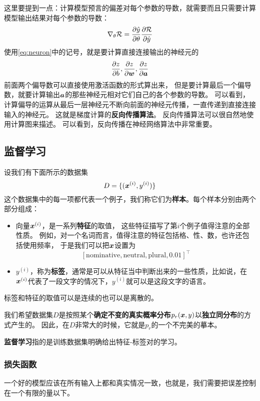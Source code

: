 \documentclass[UTF8, a4paper]{ctexart}
\begin{document}
这里要提到一点：计算模型预言的偏差对每个参数的导数，就需要而且只需要计算模型输出结果对每个参数的导数：
\[
    \nabla_\theta \mathcal{R} = \pdv{\hat{y}}{\theta} \pdv{\mathcal{R}}{\hat{y}}
\]
使用\eqref{eq:neuron}中的记号，就是要计算直接连接输出的神经元的
\[
    \pdv{z}{b}, \pdv{z}{\vb*{w}}, \pdv{z}{\vb*{a}}
\]
前面两个偏导数可以直接使用激活函数的形式算出来，
但是要计算最后一个偏导数，就要计算输出$\vb*{a}$的那些神经元相对它们自己的各个参数的导数。
可以看到，计算偏导的运算从最后一层神经元不断向前面的神经元传播，一直传递到直接连接输入的神经元。
这就是梯度计算的\textbf{反向传播算法}。
反向传播算法可以很自然地使用计算图来描述。
可以看到，反向传播在神经网络算法中非常重要。

\hypertarget{sec:supervised-learning}{%
\subsection{监督学习}\label{sec:supervised-learning}}

设我们有下面所示的数据集
\[
D = \{(\vb*{x}^{(i)}, y^{(i)})\}
\]
这个数据集中的每一项都代表一个例子，我们称它们为\textbf{样本}。每个样本分别由两个部分组成：
\begin{itemize}
    \item 向量$\vb*{x}^{(i)}$，是一系列\textbf{特征}的取值，
    这些特征描写了第$i$个例子值得注意的全部性质。
    例如，对一个名词而言，值得注意的特征包括格、性、数，也许还包括使用频率，
    于是我们可以把$\vb*{x}$设置为
    \[
        [\text{nominative}, \text{neutral}, \text{plural}, 0.01]^\top
    \]
    \item $y^{(i)}$，称为\textbf{标签}，通常是可以从特征当中判断出来的一些性质，比如说，在$\vb*{x}^{(i)}$代表了一段文字的情况下，$y^{(i)}$就可以是这段文字的语言。
\end{itemize}

标签和特征的取值可以是连续的也可以是离散的。

我们希望数据集$D$是按照某个\textbf{确定不变的真实概率分布}$p_r(\vb*{x}, y)$以\textbf{独立同分布}的方式产生的。
因此，在$D$非常大的时候，它就是$p_r$的一个不完美的摹本。

\textbf{监督学习}指的是训练数据集明确给出特征-标签对的学习。

\subsubsection{损失函数}

一个好的模型应该在所有输入上都和真实情况一致，也就是，我们需要把误差控制在一个有限的量以下。
\end{document}
